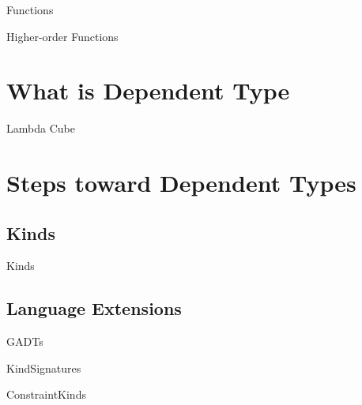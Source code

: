 \documentclass[xcolor={usenames,dvipsnames}]{beamer}
\begin{document}
\begin{frame}[fragile]{Functions}
\end{frame}

\begin{frame}[fragile]{Higher-order Functions}
\end{frame}


\section{What is Dependent Type}

\begin{frame}[fragile]{Lambda Cube}
\end{frame}

\section{Steps toward Dependent Types}

\subsection{Kinds}
\begin{frame}[fragile]{Kinds}
\end{frame}


\subsection{Language Extensions}

\begin{frame}[fragile]{GADTs}
\end{frame}

\begin{frame}[fragile]{KindSignatures}
\end{frame}

\begin{frame}[fragile]{ConstraintKinds}
\end{frame}
\end{document}
